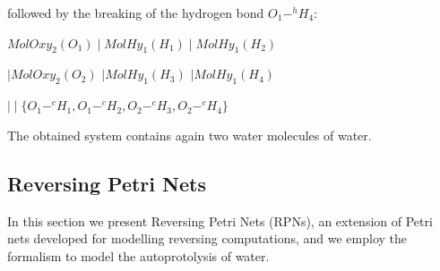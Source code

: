 \documentclass[runningheads]{llncs}
\newcommand{\MolOxy}{\mathit{MolOxy}}
\newcommand{\MolHy}{\mathit{MolHy}}
\begin{document}
\noindent 
followed by the breaking of the hydrogen bond $O_1-^h H_4$:

\begin{center}$\MolOxy_2(O_1) \mid \MolHy_1(H_1) \mid \MolHy_1(H_2) $\end{center}

\begin{center}$\mid \MolOxy_2(O_2)$ $ \mid \MolHy_1(H_3)$ $ \mid \MolHy_{1}(H_4)$\end{center}

\begin{center}$\mid\mid \{O_1 -^c H_1, O_1 -^c H_2, O_2 -^c H_3, O_2 -^c H_4\}$\end{center}

\noindent 
The obtained system contains again two water molecules of water.

\subsection{Reversing Petri Nets}
In this section we present Reversing Petri Nets (RPNs), an extension of Petri nets
developed for modelling reversing computations, and we employ the formalism
to model the autoprotolysis of water. 
\end{document}
